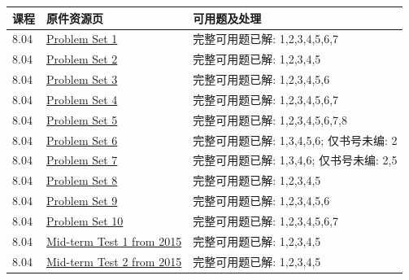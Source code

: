 \begin{longtable}{p{}p{}p{}}
\toprule 课程 & 原件资源页 & 可用题及处理\\\midrule\endhead
8.04 & \href{https://ocw.mit.edu/courses/8-04-quantum-physics-i-spring-2016/resources/mit8_04s16_ps1_2016/}{Problem Set 1} & 完整可用题已解: 1,2,3,4,5,6,7\\
8.04 & \href{https://ocw.mit.edu/courses/8-04-quantum-physics-i-spring-2016/resources/mit8_04s16_ps2_2016/}{Problem Set 2} & 完整可用题已解: 1,2,3,4,5\\
8.04 & \href{https://ocw.mit.edu/courses/8-04-quantum-physics-i-spring-2016/resources/mit8_04s16_ps3_2016/}{Problem Set 3} & 完整可用题已解: 1,2,3,4,5,6\\
8.04 & \href{https://ocw.mit.edu/courses/8-04-quantum-physics-i-spring-2016/resources/mit8_04s16_ps4_2016/}{Problem Set 4} & 完整可用题已解: 1,2,3,4,5,6,7\\
8.04 & \href{https://ocw.mit.edu/courses/8-04-quantum-physics-i-spring-2016/resources/mit8_04s16_ps5_2016/}{Problem Set 5} & 完整可用题已解: 1,2,3,4,5,6,7,8\\
8.04 & \href{https://ocw.mit.edu/courses/8-04-quantum-physics-i-spring-2016/resources/mit8_04s16_ps6_2016/}{Problem Set 6} & 完整可用题已解: 1,3,4,5,6; 仅书号未编: 2\\
8.04 & \href{https://ocw.mit.edu/courses/8-04-quantum-physics-i-spring-2016/resources/mit8_04s16_ps7_2016/}{Problem Set 7} & 完整可用题已解: 1,3,4,6; 仅书号未编: 2,5\\
8.04 & \href{https://ocw.mit.edu/courses/8-04-quantum-physics-i-spring-2016/resources/mit8_04s16_ps8_2016/}{Problem Set 8} & 完整可用题已解: 1,2,3,4,5\\
8.04 & \href{https://ocw.mit.edu/courses/8-04-quantum-physics-i-spring-2016/resources/mit8_04s16_ps9_2016/}{Problem Set 9} & 完整可用题已解: 1,2,3,4,5,6\\
8.04 & \href{https://ocw.mit.edu/courses/8-04-quantum-physics-i-spring-2016/resources/mit8_04s16_ps10_2016/}{Problem Set 10} & 完整可用题已解: 1,2,3,4,5,6,7\\
8.04 & \href{https://ocw.mit.edu/courses/8-04-quantum-physics-i-spring-2016/resources/mit8_04s16_test1_fall2015/}{Mid-term Test 1 from 2015} & 完整可用题已解: 1,2,3,4,5\\
8.04 & \href{https://ocw.mit.edu/courses/8-04-quantum-physics-i-spring-2016/resources/mit8_04s16_test2_fall2015/}{Mid-term Test 2 from 2015} & 完整可用题已解: 1,2,3,4,5\\

\end{longtable}

